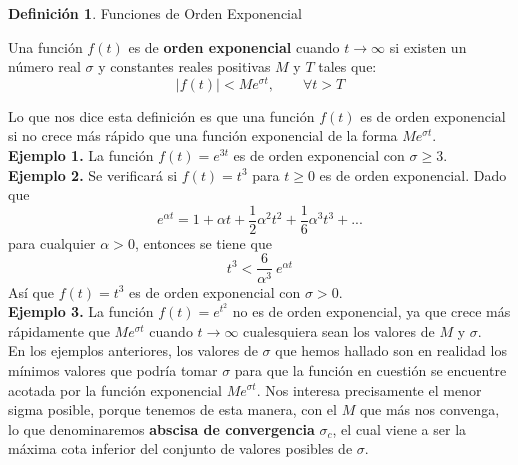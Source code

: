 \documentclass[12pt]{article}
\theoremstyle{definition}
\newtheorem{definition}{Definici\'on}[section]
\theoremstyle{theorem}
\theoremstyle{corolary}
\theoremstyle{method}
\begin{document}
\colorbox{blue!40!white!80}{\parbox{\linewidth}{
\theoremstyle{definition}
\begin{definition}{Funciones de Orden Exponencial}

Una funci\'on $f(t)$ es de \textbf{orden exponencial} cuando $t\to \infty$ si existen un n\'umero real $\sigma$ y constantes reales positivas $M$ y $T$ tales que: $$|f(t)| < Me^{\sigma t}, \qquad \forall t > T$$
\end{definition}}}
\linebreak

Lo que nos dice esta definici\'on es que una funci\'on $f(t)$ es de orden exponencial si no crece m\'as r\'apido que una funci\'on exponencial de la forma $Me^{\sigma t}$.\\

\textbf{Ejemplo 1.} La funci\'on $f(t)=e^{3t}$ es de orden exponencial con $\sigma \geq 3$.\\

\textbf{Ejemplo 2.} Se verificar\'a si $f(t)=t^3$ para $t\geq 0$ es de orden exponencial. Dado que $$e^{\alpha t} = 1 + \alpha t + \frac{1}{2}\alpha^2 t^2 + \frac{1}{6} \alpha^3 t^3 + ...$$ para cualquier $\alpha > 0$, entonces se tiene que $$t^3 < \frac{6}{\alpha^3}\ e^{\alpha t}$$ As\'i que $f(t)=t^3$ es de orden exponencial con $\sigma > 0.$\\

\textbf{Ejemplo 3.} La funci\'on $f(t) = e^{t^2}$ no es de orden exponencial, ya que crece m\'as r\'apidamente que $Me^{\sigma t}$ cuando $t\to \infty$ cualesquiera sean los valores de $M$ y $\sigma$.\\

En los ejemplos anteriores, los valores de $\sigma$ que hemos hallado son en realidad los m\'inimos valores que podr\'ia tomar $\sigma$ para que la funci\'on en cuesti\'on se encuentre acotada por la funci\'on exponencial $Me^{\sigma t}$. Nos interesa precisamente el menor sigma posible, porque tenemos de esta manera, con el $M$ que m\'as nos convenga, lo que denominaremos \textbf{abscisa de convergencia} $\sigma_c$, el cual viene a ser la m\'axima cota inferior del conjunto de valores posibles de $\sigma$.



\end{document}

